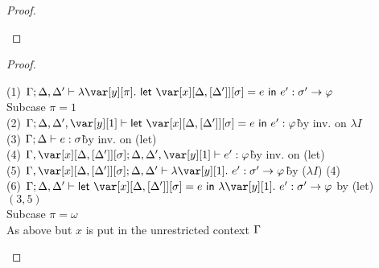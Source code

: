 \FloatInTheorem

\begin{proof}~

\begin{tabbing}

\end{tabbing}
\end{proof}


\FullLazinessTheorem

\begin{proof}~

\begin{tabbing}
    (1) $\G; \D,\D' \vdash \lambda \y[\pi].~\llet{\xD = e}{e'} : \s' \to \vp$\\
    Subcase $\pi = 1$\\
    (2) $\G; \D,\D',\y[1] \vdash \llet{\xD = e}{e'} : \vp$\`by inv. on $\lambda I$\\
    (3) $\Gamma; \Delta \vdash e : \sigma$\` by inv. on (let)\\
    (4) $\G, \xD; \D, \D', \y[1] \vdash e' : \vp$\`by inv. on (let)\\
    (5) $\G, \xD; \D, \D' \vdash \lambda \y[1].~e' : \s' \to \vp$\`by ($\lambda I$) (4)\\
    (6) $\G; \D,\D' \vdash \llet{\xD = e}{\lambda \y[1].~e'} : \s' \to \vp$ by (let) $(3,5)$\\
    Subcase $\pi = \omega$\\
    As above but $x$ is put in the unrestricted context $\Gamma$
\end{tabbing}
\end{proof}


\LocalTransformationsTheorem

